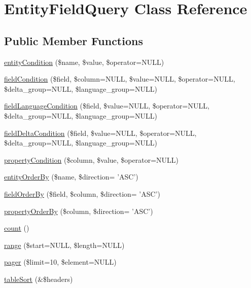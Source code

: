 \hypertarget{classEntityFieldQuery}{
\section{EntityFieldQuery Class Reference}
\label{classEntityFieldQuery}
}
\subsection*{Public Member Functions}
\begin{DoxyCompactItemize}
\item 
\hyperlink{classEntityFieldQuery_a08559bd2f164f707a7ad18eff6622017}{entityCondition} (\$name, \$value, \$operator=NULL)
\item 
\hyperlink{classEntityFieldQuery_aa8f9660691c0ff6aca2e535c3df78e92}{fieldCondition} (\$field, \$column=NULL, \$value=NULL, \$operator=NULL, \$delta\_\-group=NULL, \$language\_\-group=NULL)
\item 
\hyperlink{classEntityFieldQuery_a4c09c59b7bea2f57e8c8b50ef641fbf4}{fieldLanguageCondition} (\$field, \$value=NULL, \$operator=NULL, \$delta\_\-group=NULL, \$language\_\-group=NULL)
\item 
\hyperlink{classEntityFieldQuery_a2008e72f472747354332f0b42971032f}{fieldDeltaCondition} (\$field, \$value=NULL, \$operator=NULL, \$delta\_\-group=NULL, \$language\_\-group=NULL)
\item 
\hyperlink{classEntityFieldQuery_a732e6068c9fdba15a8142cc03328973e}{propertyCondition} (\$column, \$value, \$operator=NULL)
\item 
\hyperlink{classEntityFieldQuery_aaec910a18a4d4d168dcb1f6a004a604e}{entityOrderBy} (\$name, \$direction= 'ASC')
\item 
\hyperlink{classEntityFieldQuery_ad2256f83946cc87c91a960f7a81ce833}{fieldOrderBy} (\$field, \$column, \$direction= 'ASC')
\item 
\hyperlink{classEntityFieldQuery_af53f3f1b5da41238638389da6e153dbe}{propertyOrderBy} (\$column, \$direction= 'ASC')
\item 
\hyperlink{classEntityFieldQuery_afa3972b551da6115ad5749646df151d4}{count} ()
\item 
\hyperlink{classEntityFieldQuery_abcea9c7dece049640ef9034f703bd9d7}{range} (\$start=NULL, \$length=NULL)
\item 
\hyperlink{classEntityFieldQuery_a31f0215e7fc7a6469e97bfd850430fb7}{pager} (\$limit=10, \$element=NULL)
\item 
\hyperlink{classEntityFieldQuery_a582ffe2a0a08dc4def3076af2bc6563a}{tableSort} (\&\$headers)

\end{DoxyCompactItemize}
